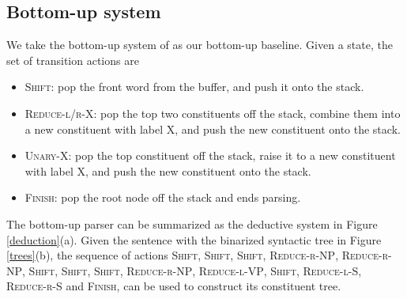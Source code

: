 \documentclass[11pt,letterpaper]{article}
\begin{document}
\subsection{Bottom-up system}
We take the bottom-up system of  as our bottom-up baseline.
Given a state, the set of transition actions are
\begin{itemize}
\item \textsc{Shift}: pop the front word from the buffer, and push it onto the stack.
\item \textsc{Reduce-l/r-X}: pop the top two constituents off the stack, combine them into a new constituent with label X, and push the new constituent onto the stack.
\item \textsc{Unary-X}: pop the top constituent off the stack, raise it to a new constituent with label X, and push the new constituent onto the stack.
\item \textsc{Finish}: pop the root node off the stack and ends parsing.
\end{itemize}
The bottom-up parser can be summarized as the deductive system in Figure \ref{deduction}(a).
Given the sentence with the binarized syntactic tree in Figure \ref{trees}(b), the sequence of actions \textsc{Shift}, \textsc{Shift}, \textsc{Shift}, \textsc{Reduce-r-NP}, \textsc{Reduce-r-NP}, \textsc{Shift}, \textsc{Shift}, \textsc{Shift}, \textsc{Reduce-r-NP}, \textsc{Reduce-l-VP}, \textsc{Shift}, \textsc{Reduce-l-S}, \textsc{Reduce-r-S} and \textsc{Finish}, can be used to construct its constituent tree.
\end{document}
